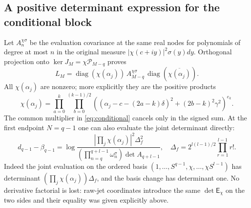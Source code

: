 \documentclass[11pt,a4paper]{article}
\newcommand{\diag}{\operatorname{diag}}
\begin{document}
\subsection{A positive determinant expression for the conditional block}
Let $A_n^{\chi\sigma}$ be the evaluation covariance at the same real nodes for polynomials of degree at most $n$ in the original measure $|\chi(c+iy)|^2\sigma(y)dy$. Orthogonal projection onto $\ker J_M=\chi\mathcal P_{M-q}$ proves
\begin{equation}
 \boxed{L_M=\diag(\chi(\alpha_j))\,A_{M-q}^{\chi\sigma}\,
 \diag(\overline{\chi(\alpha_j)}).}\label{eq:conditional}
\end{equation}
All $\chi(\alpha_j)$ are nonzero; more explicitly they are the positive products
\begin{equation}
 \chi(\alpha_j)=
 \prod_{a=0}^k\prod_{b=0}^{(k-1)/2}
 \left((\alpha_j-c-(2a-k)\delta)^2+(2b-k)^2\gamma^2\right)^{e_k}.
\end{equation}
The common multiplier in \eqref{eq:conditional} cancels only in the signed sum. At the first endpoint $N=q-1$ one can also evaluate the joint determinant directly:
\begin{equation}
 d_{q-1}-\beta_{q-1}
 =\log\frac{\left|\prod_j\chi(\alpha_j)\right|^2\Delta_f^2}
 {\left(\prod_{n=q}^{q+l-1}\omega_n^\sigma\right)\det A_{q+l-1}},
 \quad
 \Delta_f=2^{l(l-1)/2}\prod_{r=1}^{l-1}r!.
 \label{eq:first}
\end{equation}
Indeed the joint evaluation on the ordered basis $(1,\ldots,S^{q-1},\chi,\ldots,\chi S^{l-1})$ has determinant $(\prod_j\chi(\alpha_j))\Delta_f$, and the basis change has determinant one. No derivative factorial is lost: raw-jet coordinates introduce the same $\det\mathsf E_\chi$ on the two sides and their equality was given explicitly above.
\end{document}
